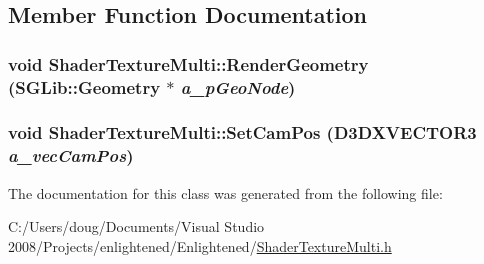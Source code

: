 \subsection{Member Function Documentation}
\hypertarget{class_shader_texture_multi_a2fbc89fdebf09b156d399337b2b39f24}{
\subsubsection[{RenderGeometry}]{\setlength{\rightskip}{0pt plus 5cm}void ShaderTextureMulti::RenderGeometry (SGLib::Geometry $\ast$ {\em a\_\-pGeoNode})}}
\label{class_shader_texture_multi_a2fbc89fdebf09b156d399337b2b39f24}
\hypertarget{class_shader_texture_multi_a30155c23904b627480b7821f85854390}{
\subsubsection[{SetCamPos}]{\setlength{\rightskip}{0pt plus 5cm}void ShaderTextureMulti::SetCamPos (D3DXVECTOR3 {\em a\_\-vecCamPos})}}
\label{class_shader_texture_multi_a30155c23904b627480b7821f85854390}


The documentation for this class was generated from the following file:\begin{DoxyCompactItemize}
\item 
C:/Users/doug/Documents/Visual Studio 2008/Projects/enlightened/Enlightened/\hyperlink{_shader_texture_multi_8h}{ShaderTextureMulti.h}\end{DoxyCompactItemize}
